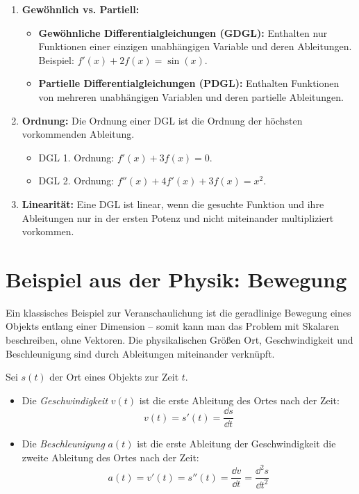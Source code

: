 \begin{enumerate}
    \item \textbf{Gewöhnlich vs. Partiell:}
    \begin{itemize}
        \item \textbf{Gewöhnliche Differentialgleichungen (GDGL):} Enthalten nur Funktionen einer einzigen unabhängigen Variable und deren Ableitungen. Beispiel: $f'(x) + 2f(x) = \sin(x)$.
        \item \textbf{Partielle Differentialgleichungen (PDGL):} Enthalten Funktionen von mehreren unabhängigen Variablen und deren partielle Ableitungen.
    \end{itemize}
    \item \textbf{Ordnung:} Die Ordnung einer DGL ist die Ordnung der höchsten vorkommenden Ableitung.
    \begin{itemize}
        \item DGL 1. Ordnung: $f'(x) + 3 f(x) = 0$.
        \item DGL 2. Ordnung: $f''(x) + 4f'(x) + 3f(x) = x^2$.
    \end{itemize}
    \item \textbf{Linearität:} Eine DGL ist linear, wenn die gesuchte Funktion und ihre Ableitungen nur in der ersten Potenz und nicht miteinander multipliziert vorkommen.
\end{enumerate}

\section{Beispiel aus der Physik: Bewegung}
Ein klassisches Beispiel zur Veranschaulichung ist die geradlinige Bewegung eines Objekts entlang einer Dimension -- somit kann man das Problem mit Skalaren beschreiben, ohne Vektoren. Die physikalischen Größen Ort, Geschwindigkeit und Beschleunigung sind durch Ableitungen miteinander verknüpft.

Sei $s(t)$ der Ort eines Objekts zur Zeit $t$.
\begin{itemize}
    \item Die \textit{Geschwindigkeit} $v(t)$ ist die erste Ableitung des Ortes nach der Zeit:
    $$ v(t) = s'(t) = \frac{\dd s}{\dd t} $$
    \item Die \textit{Beschleunigung} $a(t)$ ist die erste Ableitung der Geschwindigkeit \bzw die zweite Ableitung des Ortes nach der Zeit:
    $$ a(t) = v'(t) = s''(t) = \frac{\dd v}{\dd t} = \frac{\dd^2 s}{\dd t^2} $$
\end{itemize}

